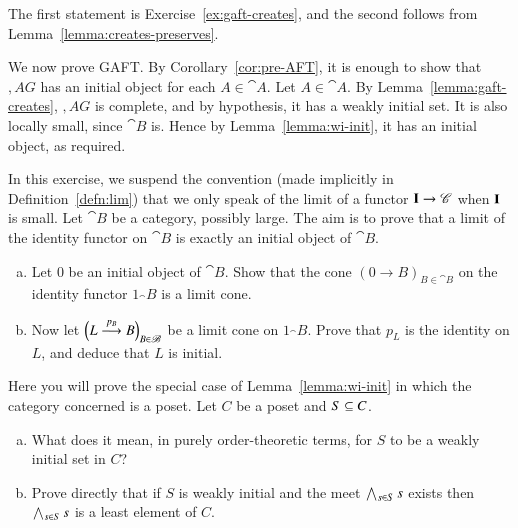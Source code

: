 \begin{pf}
The first statement is
Exercise~\ref{ex:gaft-creates}, and the
second follows from Lemma~\ref{lemma:creates-preserves}.
\end{pf}

We now prove GAFT.  By Corollary~\ref{cor:pre-AFT}, it is enough to show
that $\comma{A}{G}$ has an initial object for each $A \in \cat{A}$.  Let $A
\in \cat{A}$.  By Lemma~\ref{lemma:gaft-creates}, $\comma{A}{G}$ is
complete, and by hypothesis, it has a weakly initial set.  It is also
locally small, since $\cat{B}$ is.  Hence by Lemma~\ref{lemma:wi-init}, it
has an initial object, as required.


\exs


\begin{aquestion}
\label{ex:lim-of-id}
In this exercise, we suspend the convention (made implicitly in
Definition~\ref{defn:lim}) that we only speak of the limit of a functor
$\mathbf{I} \to \mathscr{C}$ when $\mathbf{I}$ is small.%
%
%
%
Let $\cat{B}$ be a
category, possibly large.  The aim is to prove that a limit%
%
%
%
%
of the identity functor on $\cat{B}$ is exactly an initial object of
$\cat{B}$.
%
\begin{enumerate}[(b)]
\item
Let $0$ be an initial object of $\cat{B}$.  Show that the cone $(0 \to
B)_{B \in \cat{B}}$ on the identity functor $1_\cat{B}$ is a limit cone.

\item
Now let $\Bigl(L \stackrel{p_B}{\longrightarrow} B\Bigr)_{B \in \mathscr{B}}$ be a limit cone on
$1_\cat{B}$.  Prove that $p_L$ is the identity on $L$, and deduce that $L$
is initial.
\end{enumerate}
\end{aquestion}


\begin{aquestion}
\label{ex:wi-poset}
Here you will prove the special case of Lemma~\ref{lemma:wi-init} in which
the category concerned is a poset.  Let $C$ be a poset and $S \subseteq C$.
%
\begin{enumerate}[(b)]
\item
What does it mean, in purely order-theoretic terms, for $S$ to be a weakly
initial set in $C$?

\item
Prove directly that if $S$ is weakly initial and the meet $\bigwedge_{s \in S}
s$ exists then $\bigwedge_{s \in S} s$ is a least%
%
%
element of $C$.%
%
%
%
\end{enumerate}
\end{aquestion}


